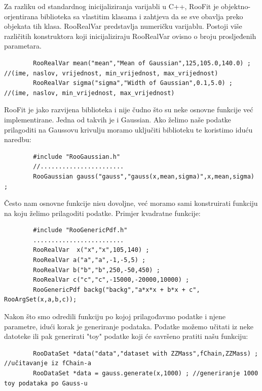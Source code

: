 \documentclass[12pt,a4paper,oneside]{article}
\begin{document}
\begin{linenumbers}
		Za razliku od standardnog inicijaliziranja varijabli u C++, RooFit je objektno-orjentirana biblioteka sa vlastitim klasama i zahtjeva da se sve obavlja preko objekata tih klasa.
		RooRealVar predstavlja numeričku varijablu. Postoji više različitih konstruktora koji inicijaliziraju RooRealVar ovisno o broju prosljeđenih parametara.
		\begin{verbatim}
		RooRealVar mean("mean","Mean of Gaussian",125,105.0,140.0) ; //(ime, naslov, vrijednost, min_vrijednost, max_vrijednost)
		RooRealVar sigma("sigma","Width of Gaussian",0.1,5.0) ; //(ime, naslov, min_vrijednost, max_vrijednost)
		\end{verbatim}
		
		RooFit je jako razvijena biblioteka i nije čudno što su neke osnovne funkcije već implementirane. Jedna od takvih je i Gaussian. Ako želimo naše podatke prilagoditi na Gaussovu krivulju moramo uključiti biblioteku te koristimo iduću naredbu:
		\begin{verbatim}
		#include "RooGaussian.h"
		//.......................
		RooGaussian gauss("gauss","gauss(x,mean,sigma)",x,mean,sigma) ; 
		\end{verbatim}
		
		Često nam osnovne funkcije nisu dovoljne, već moramo sami konstruirati funkciju na koju želimo prilagoditi podatke. Primjer kvadratne funkcije:
		
		\begin{verbatim}
		#include "RooGenericPdf.h"
		.........................
		RooRealVar  x("x","x",105,140) ;
		RooRealVar a("a","a",-1,-5,5) ;
		RooRealVar b("b","b",250,-50,450) ;
		RooRealVar c("c","c",-15000,-20000,10000) ;
		RooGenericPdf backg("backg","a*x*x + b*x + c", RooArgSet(x,a,b,c));
		\end{verbatim}
		
		Nakon što smo odredili funkciju po kojoj prilagođavmo podatke i njene parametre, idući korak je generiranje podataka. Podatke možemo učitati iz neke datoteke ili pak generirati "toy" podatke koji će savršeno pratiti našu funkciju:
		
		\begin{verbatim}
		RooDataSet *data("data","dataset with ZZMass",fChain,ZZMass) ; //učitavanje iz fChain-a
		RooDataSet *data = gauss.generate(x,1000) ; //generiranje 1000 toy podataka po Gauss-u
		\end{verbatim}
		

\end{linenumbers}
\end{document}
